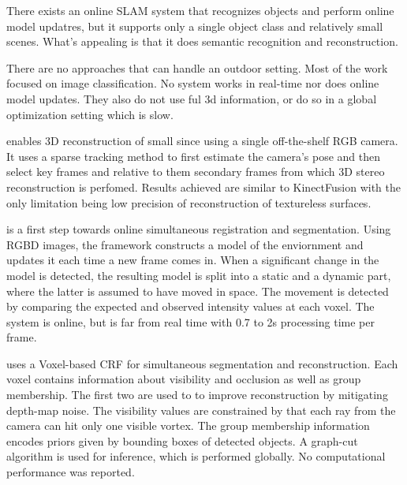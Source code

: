\documentclass{llncs}
\begin{document}
      There exists an online SLAM system that recognizes objects and perform online model updatres, but it supports only a single object class and relatively small scenes. What's appealing is that it does semantic recognition and reconstruction.
      
      There are no approaches that can handle an outdoor setting. Most of the work focused on image classification. No system works in real-time nor does online model updates. They also do not use ful 3d information, or do so in a global optimization setting which is slow. 
      
      
  \cite{Monofusion} enables 3D reconstruction of small since using a single off-the-shelf RGB camera. It uses a sparse tracking method to first estimate the camera's pose and then select key frames and relative to them secondary frames from which 3D stereo reconstruction is perfomed. Results achieved are similar to KinectFusion with the only limitation being low precision of reconstruction of textureless surfaces. 
      
  \cite{ChangeDetection} is a first step towards online simultaneous registration and segmentation. Using RGBD images, the framework constructs a model of the enviornment and updates it each time a new frame comes in. When a significant change in the model is detected, the resulting model is split into a static and a dynamic part, where the latter is assumed to have moved in space. The movement is detected by comparing the expected and observed intensity values at each voxel. The system is online, but is far from real time with 0.7 to 2s processing time per frame.
  
  \cite{mesh}
      
  \cite{VCRF} uses a Voxel-based CRF for simultaneous segmentation and reconstruction. Each voxel contains information about visibility and occlusion as well as group membership. The first two are used to to improve reconstruction by mitigating depth-map noise. The visibility values are constrained by that each ray from the camera can hit only one visible vortex. The group membership information encodes priors given by bounding boxes of detected objects. A graph-cut algorithm is used for inference, which is performed globally. No computational performance was reported.   
    
\end{document}
